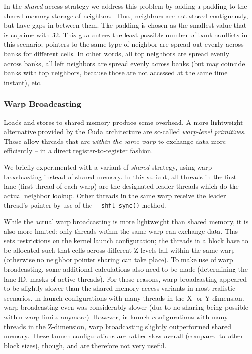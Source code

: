In the \emph{shared} access strategy we address this problem by adding a padding to the shared memory storage of neighbors. Thus, neighbors are not stored contiguously, but have gaps in between them. The padding is chosen as the smallest value that is coprime with $32$. This guarantees the least possible number of bank conflicts in this scenario; pointers to the same type of neighbor are spread out evenly across banks for different cells. In other words, all top neighbors are spread evenly across banks, all left neighbors are spread evenly across banks (but may coincide banks with top neighbors, because those are not accessed at the same time instant), etc.

\subsubsection{Warp Broadcasting}

Loads and stores to shared memory produce some overhead. A more lightweight alternative provided by the Cuda architecture are so-called \emph{warp-level primitives}. Those allow threads that are \emph{within the same warp} to exchange data more efficiently -- in a direct register-to-register fashion.

We briefly experimented with a variant of \emph{shared} strategy, using warp broadcasting instead of shared memory. In this variant, all threads in the first lane (first thread of each warp) are the designated leader threads which do the actual neighbor lookup. Other threads in the same warp receive the leader thread's pointer by use of the \texttt{\_\_shfl\_sync()} method.

While the actual warp broadcasting is more lightweight than shared memory, it is also more limited: only threads within the same warp can exchange data. This sets restrictions on the kernel launch configuration; the threads in a block have to be allocated such that cells across different Z-levels fall within the same warp (otherwise no neighbor pointer sharing can take place). To make use of warp broadcasting, some additional calculations also need to be made (determining the lane ID, masks of active threads). For those reasons, warp broadcasting appeared to be slightly slower than the shared memory access variants in most realistic scenarios. In launch configurations with many threads in the X- or Y-dimension, warp broadcasting even was considerably slower (due to no sharing being possible within warp limits anymore). However, in launch configurations with many threads in the Z-dimension, warp broadcasting slightly outperformed shared memory. These launch configurations are rather slow overall (compared to other block sizes), though, and are therefore not very useful.


